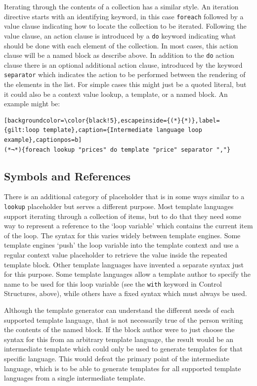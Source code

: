 Iterating through the contents of a collection has a similar style. An iteration directive starts with an identifying keyword, in this case \verb!foreach! followed by a value clause indicating how to locate the collection to be iterated. Following the value clause, an action clause is introduced by a \verb!do! keyword indicating what should be done with each element of the collection. In most cases, this action clause will be a named block as describe above. In addition to the \verb!do! action clause there is an optional additional action clause, introduced by the keyword \verb!separator! which indicates the action to be performed between the rendering of the elements in the list. For simple cases this might just be a quoted literal, but it could also be a context value lookup, a template, or a named block. An example might be:

\begin{lstlisting}[backgroundcolor=\color{black!5},escapeinside={(*}{*)},label={gilt:loop template},caption={Intermediate language loop example},captionpos=b]
(*¬*){foreach lookup "prices" do template "price" separator ","}
\end{lstlisting}

\subsection*{Symbols and References}
\label{gilt:symbolsl}

There is an additional category of placeholder that is in some ways similar to a \verb!lookup! placeholder but serves a different purpose. Most template languages support iterating through a collection of items, but to do that they need some way to represent a reference to the `loop variable' which contains the current item of the loop. The syntax for this varies widely between template engines. Some template engines `push' the loop variable into the template context and use a regular context value placeholder to retrieve the value inside the repeated template block. Other template languages have invented a separate syntax just for this purpose. Some template languages allow a template author to specify the name to be used for this loop variable (see the \verb!with! keyword in Control Structures, above), while others have a fixed syntax which must always be used.

Although the template generator can understand the different needs of each supported template language, that is not necessarily true of the person writing the contents of the named block. If the block author were to just choose the syntax for this from an arbitrary template language, the result would be an intermediate template which could only be used to generate templates for that specific language. This would defeat the primary point of the intermediate language, which is to be able to generate templates for all supported template languages from a single intermediate template.

